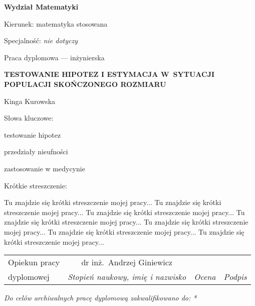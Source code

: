 \documentclass[12pt,a4paper,twoside]{book}
\begin{document}
\begin{titlepage}
\noindent\textbf{\large Wydział Matematyki}
\par\medskip\noindent
Kierunek: matematyka stosowana
\par\noindent
Specjalność: \textit{nie dotyczy}
\vspace*{36pt}
\begin{center}
\LARGE Praca dyplomowa --- inżynierska
\end{center}
\vspace*{24pt}
\begin{center}
\uppercase{\Large\bfseries%
Testowanie hipotez i estymacja w~sytuacji populacji sko\'nczonego rozmiaru}
\end{center}
\vspace*{12pt}
\begin{center}
Kinga Kurowska
\end{center}
\vspace*{12pt}
\begin{flushright}
Słowa kluczowe:\par\noindent
testowanie hipotez\par\noindent
przedziały nieufności\par\noindent
zastosowanie w medycynie\par\noindent
\end{flushright}
\begin{flushleft}
Krótkie streszczenie:\par
Tu znajdzie się krótki streszczenie mojej pracy... Tu znajdzie się krótki streszczenie mojej pracy... Tu znajdzie się krótki streszczenie mojej pracy... Tu znajdzie się krótki streszczenie mojej pracy... Tu znajdzie się krótki streszczenie mojej pracy... Tu znajdzie się krótki streszczenie mojej pracy... Tu znajdzie się krótki streszczenie mojej pracy...
\smallskip
\end{flushleft}
\begin{tabularx}{\textwidth}{|l|c|X|X|}
\hline
{\footnotesize Opiekun pracy} & {\small dr inż.\ Andrzej Giniewicz} &  &  \\
\cline{2-4}
{\footnotesize dyplomowej} & \textit{\footnotesize Stopień naukowy, imię i nazwisko} & \textit{\footnotesize Ocena} & \textit{\footnotesize Podpis} \\
\hline
\end{tabularx}
\smallskip
\begin{flushleft}
\small\itshape
Do celów archiwalnych pracę dyplomową zakwalifikowano do: *

\end{flushleft}
\end{titlepage}
\end{document}
